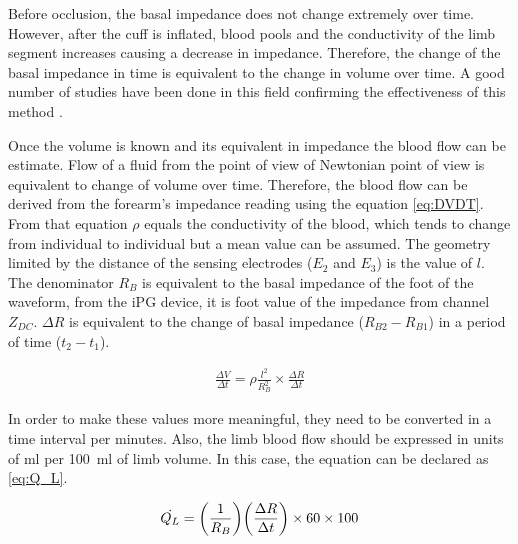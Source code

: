 Before occlusion, the basal impedance does not change extremely over time. However, after the cuff is inflated, blood pools and the conductivity of the limb segment increases causing a decrease in impedance. Therefore, the change of the basal impedance in time is equivalent to the change in volume over time. A good number of studies have been done in this field confirming the effectiveness of this method \cite{anderson1984impedance,costeloe1980continuous,mohapatra1981non,golden1986assessment}. 


Once the volume is known and its equivalent in impedance the blood flow can be estimate. Flow of a fluid from the point of view of Newtonian point of view is equivalent to change of volume over time. Therefore, the blood flow can be derived from the forearm's impedance reading using the equation \ref{eq:DVDT}. From that equation $\rho$ equals the conductivity of the blood, which tends to change from individual to individual but a mean value can be assumed. The geometry limited by the distance of the sensing electrodes ($E_2$ and $E_3$) is the value of $l$. The denominator $R_B$ is equivalent to the basal impedance of the foot of the waveform, from the iPG device, it is foot value of the impedance from channel $Z_{DC}$. $\Delta R$ is equivalent to the change of basal impedance ($R_{B2} - R_{B1}$) in a period of time ($t_2 - t_1$). 

\begin{align}
	\label{eq:DVDT}
	\frac{\Delta V}{\Delta t}= \rho \frac{l^2}{R_B^2} \times \frac{\Delta R}{\Delta t}
\end{align} 

In order to make these values more meaningful, they need to be converted in a time interval per minutes. Also, the limb blood flow should be expressed in units of \si{\milli\litre} per \SI{100}{\milli\litre} of limb volume. In this case, the equation can be declared as \ref{eq:Q_L}.

\begin{align}
	\label{eq:Q_L}
	\dot{Q_L} = \bigg( \frac{1}{R_B} \bigg) \bigg( \frac{\Delta R}{\Delta t} \bigg) \times 60  \times 100  \tagaddtext{[\si{ml/min.100.ml}]}
\end{align} 

